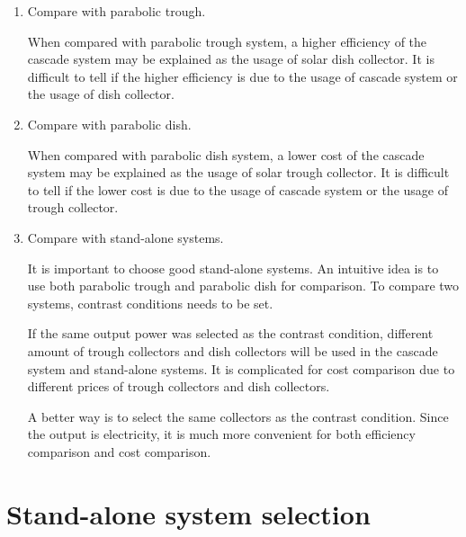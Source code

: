 \begin{enumerate}[label=(\arabic*)]
	\item Compare with parabolic trough. 

	When compared with parabolic trough system, a higher efficiency of the cascade system may be explained as the usage of solar dish collector. It is difficult to tell if the higher efficiency is due to the usage of cascade system or	the usage of dish collector.
	\item Compare with parabolic dish.
	
	When compared with parabolic dish system, a lower cost of the cascade system may be explained as the usage of solar trough collector. It is difficult to tell if the lower cost is due to the usage of cascade system or the usage of trough collector.
	\item Compare with stand-alone systems.
	
	It is important to choose good stand-alone systems. An intuitive idea is to use both parabolic trough and parabolic dish for comparison. To compare two systems, contrast conditions needs to be set. 
	
	If the same output power was selected as the contrast condition, different amount of trough collectors and dish collectors will be used in the cascade system and stand-alone systems.
	It is complicated for cost comparison due to different prices of trough collectors and dish collectors.
	
	A better way is to select the same collectors as the contrast condition. Since the output is electricity, it is much more convenient for both efficiency comparison and cost comparison.
	
\end{enumerate}


\section{Stand-alone system selection}

